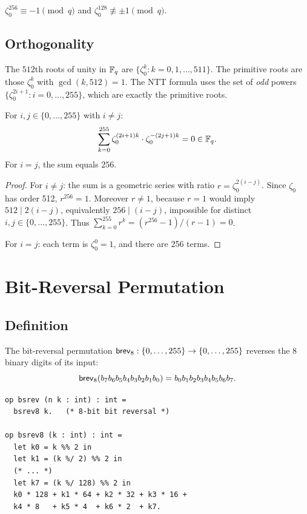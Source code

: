 \begin{corollary}
  $\zeta_0^{256} \equiv -1 \pmod{q}$ and $\zeta_0^{128} \not\equiv \pm 1 \pmod{q}$.
\label{cor:zeta256}
\end{corollary}

\subsection{Orthogonality}

The $512$th roots of unity in $\mathbb{F}_q$ are $\{\zeta_0^k : k = 0, 1, \dots, 511\}$.
The primitive roots are those $\zeta_0^k$ with $\gcd(k, 512) = 1$.  The NTT
formula uses the set of \emph{odd} powers $\{\zeta_0^{2i+1} : i = 0, \dots, 255\}$,
which are exactly the primitive roots.

\begin{lemma}
  For $i, j \in \{0, \dots, 255\}$ with $i \ne j$:
  \[
    \sum_{k=0}^{255} \zeta_0^{(2i+1)k} \cdot \zeta_0^{-(2j+1)k} = 0 \in \mathbb{F}_q.
  \]
  For $i = j$, the sum equals $256$.
\label{lem:orthogonality}
\end{lemma}

\begin{proof}
  For $i \ne j$: the sum is a geometric series with ratio
  $r = \zeta_0^{2(i-j)}$.  Since $\zeta_0$ has order 512, $r^{256}=1$.
  Moreover $r \ne 1$, because $r=1$ would imply
  $512 \mid 2(i-j)$, equivalently $256 \mid (i-j)$, impossible for
  distinct $i,j \in \{0,\dots,255\}$.  Thus
  $\sum_{k=0}^{255} r^k = (r^{256} - 1)/(r-1) = 0$.

  For $i = j$: each term is $\zeta_0^0 = 1$, and there are 256 terms.
\end{proof}

\section{Bit-Reversal Permutation}
\label{sec:brev}

\subsection{Definition}

The bit-reversal permutation $\mathsf{brev}_8 : \{0,\dots,255\} \to \{0,\dots,255\}$
reverses the 8 binary digits of its input:
\[
  \mathsf{brev}_8(b_7 b_6 b_5 b_4 b_3 b_2 b_1 b_0) = b_0 b_1 b_2 b_3 b_4 b_5 b_6 b_7.
\]

\begin{lstlisting}[language=EasyCrypt,
  caption={Bit-reversal definition in \texttt{NTTFullAlgebra.ec}},
  label={lst:brev}]
op bsrev (n k : int) : int =
  bsrev8 k.   (* 8-bit bit reversal *)

op bsrev8 (k : int) : int =
  let k0 = k %% 2 in
  let k1 = (k %/ 2) %% 2 in
  (* ... *)
  let k7 = (k %/ 128) %% 2 in
  k0 * 128 + k1 * 64 + k2 * 32 + k3 * 16 +
  k4 * 8   + k5 * 4  + k6 * 2  + k7.
\end{lstlisting}

